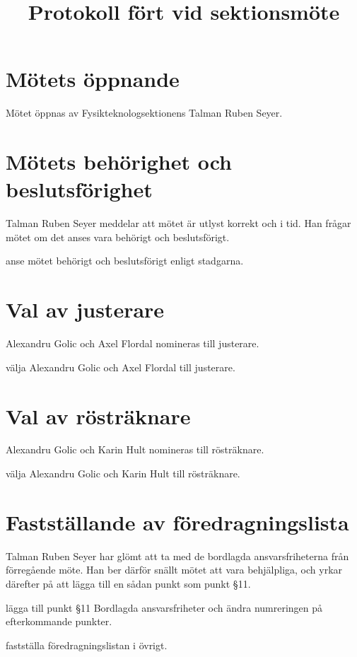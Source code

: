 \documentclass[hidelinks]{sektionsmote}
\title{Protokoll fört vid sektionsmöte}
\begin{document}
\maketitle

\section{Mötets öppnande}
Mötet öppnas \tid av Fysikteknologsektionens Talman Ruben Seyer.


\section{Mötets behörighet och beslutsförighet}
Talman Ruben Seyer meddelar att mötet är utlyst korrekt och i tid.
Han frågar mötet om det anses vara behörigt och beslutsförigt.
\begin{beslut}
    \item anse mötet behörigt och beslutsförigt enligt stadgarna.
\end{beslut}


\section{Val av justerare}
Alexandru Golic och Axel Flordal nomineras till justerare.
\begin{beslut}
  \item välja Alexandru Golic och Axel Flordal till justerare.
\end{beslut}


\section{Val av rösträknare}
Alexandru Golic och Karin Hult nomineras till rösträknare.
\begin{beslut}
  \item välja Alexandru Golic och Karin Hult till rösträknare.
\end{beslut}


\section{Fastställande av föredragningslista}
Talman Ruben Seyer har glömt att ta med de bordlagda ansvarsfriheterna från förregående möte.
Han ber därför snällt mötet att vara behjälpliga, och yrkar därefter på att lägga till en sådan punkt som punkt §11.
\begin{beslut}
  \item lägga till punkt §11 Bordlagda ansvarsfriheter och ändra numreringen på efterkommande punkter.
  \item fastställa föredragningslistan i övrigt.
\end{beslut}
\end{document}
